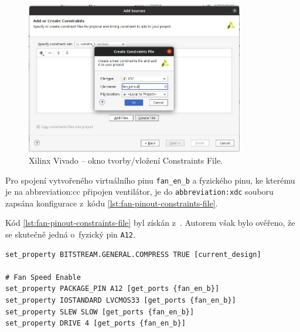 \documentclass[a4paper, twoside, 11pt]{article}
\begin{document}
				\begin{figure}[htbp!]
					\centering
					\includegraphics[width=0.85\textwidth]{src/png/kr26-xilinx-vivado-flow/kr26-xilix-vivado-flow-32.jpg}
					\caption{Xilinx Vivado – okno tvorby/vložení Constraints File.}
					\label{fig:kr26-xilix-vivado-flow-32}
				\end{figure}

				Pro spojení vytvořeného virtuálního pinu \texttt{fan\_en\_b} a fyzického pinu, ke kterému je na \gls{abbreviation:cc} připojen ventilátor, je do \texttt{\gls{abbreviation:xdc}} souboru zapsána konfigurace z~kódu \ref{lst:fan-pinout-constraints-file}.\par
				Kód \ref{lst:fan-pinout-constraints-file} byl získán z~\cite{hackster-add-peripherial-support-to-kria-kr260-vivado}. Autorem však bylo ověřeno, že se skutečně jedná o~fyzický pin \texttt{A12}.\par
				
				


				\begin{lstlisting}[language={xdc}, caption={Constraints \gls{abbreviation:xdc} soubor pro přiřazení \gls{abbreviation:pl} Vivado pinu fan\_en\_b k~fyzickému pinu \gls{abbreviation:mpsoc} na \gls{abbreviation:cc}.}, label= {lst:fan-pinout-constraints-file}]
set_property BITSTREAM.GENERAL.COMPRESS TRUE [current_design]
					
# Fan Speed Enable
set_property PACKAGE_PIN A12 [get_ports {fan_en_b}]
set_property IOSTANDARD LVCMOS33 [get_ports {fan_en_b}]
set_property SLEW SLOW [get_ports {fan_en_b}]
set_property DRIVE 4 [get_ports {fan_en_b}]\end{lstlisting}
\end{document}
